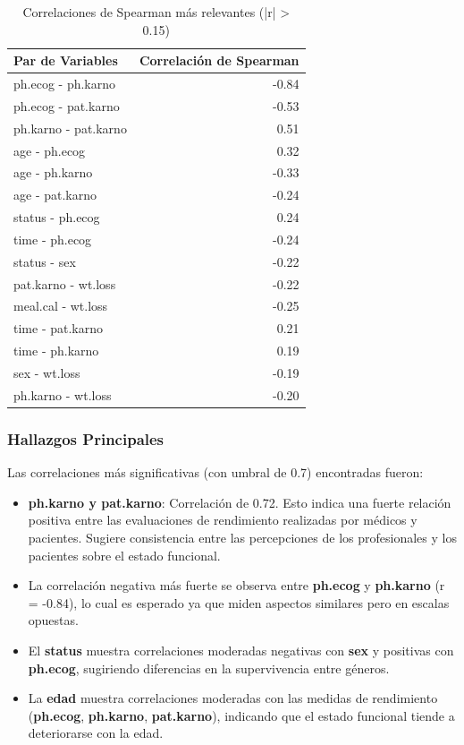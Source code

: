 \documentclass[a4paper,12pt]{article}
\begin{document}
\begin{table}[h!]
    \centering
    \small
    \begin{tabular}{|l|r|}
        \hline
        \textbf{Par de Variables} & \textbf{Correlación de Spearman} \\
        \hline
        ph.ecog - ph.karno & -0.84 \\
        ph.ecog - pat.karno & -0.53 \\
        ph.karno - pat.karno & 0.51 \\
        age - ph.ecog & 0.32 \\
        age - ph.karno & -0.33 \\
        age - pat.karno & -0.24 \\
        status - ph.ecog & 0.24 \\
        time - ph.ecog & -0.24 \\
        status - sex & -0.22 \\
        pat.karno - wt.loss & -0.22 \\
        meal.cal - wt.loss & -0.25 \\
        time - pat.karno & 0.21 \\
        time - ph.karno & 0.19 \\
        sex - wt.loss & -0.19 \\
        ph.karno - wt.loss & -0.20 \\
        \hline
    \end{tabular}
    \caption{Correlaciones de Spearman más relevantes (|r| > 0.15)}
    \label{tab:correlaciones_spearman}
\end{table}

\subsubsection*{Hallazgos Principales}
Las correlaciones más significativas (con umbral de 0.7) encontradas fueron:

\begin{itemize}
    \item \textbf{ph.karno y pat.karno}: Correlación de 0.72. Esto indica una fuerte relación positiva entre las evaluaciones de rendimiento realizadas por médicos y pacientes. Sugiere consistencia entre las percepciones de los profesionales y los pacientes sobre el estado funcional.
    \item La correlación negativa más fuerte se observa entre \textbf{ph.ecog} y \textbf{ph.karno} (r = -0.84), lo cual es esperado ya que miden aspectos similares pero en escalas opuestas.
    \item El \textbf{status} muestra correlaciones moderadas negativas con \textbf{sex} y positivas con \textbf{ph.ecog}, sugiriendo diferencias en la supervivencia entre géneros.
    \item La \textbf{edad} muestra correlaciones moderadas con las medidas de rendimiento (\textbf{ph.ecog}, \textbf{ph.karno}, \textbf{pat.karno}), indicando que el estado funcional tiende a deteriorarse con la edad.
\end{itemize}
\end{document}
